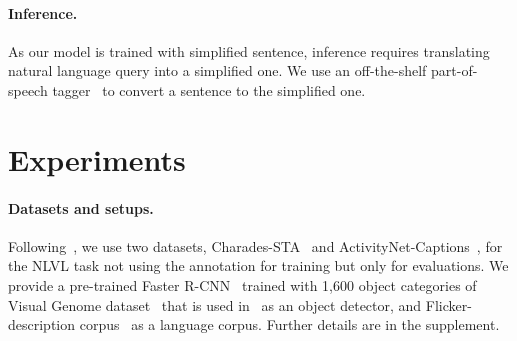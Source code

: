 \vspace{-1em}\paragraph{Inference.} 
As our model is trained with simplified sentence, inference requires translating natural language query into a simplified one. %
We use an off-the-shelf part-of-speech tagger~\cite{spacy} to convert a sentence to the simplified one.





\section{Experiments}

\paragraph{Datasets and setups.}
Following~\cite{mun2020LGI,opazo2021dori}, we use two datasets, Charades-STA~\cite{gao2017tall} and ActivityNet-Captions~\cite{anetcap}, for the NLVL task not using the annotation for training but only for evaluations. 
We provide a pre-trained Faster R-CNN~\cite{fasterrcnn} trained with 1,600 object categories of Visual Genome dataset~\cite{visualgenome} that is used in~\cite{butd} as an object detector, and Flicker-description corpus~\cite{Feng2019UnsupervisedIC} as a language corpus.
Further details are in the supplement.

